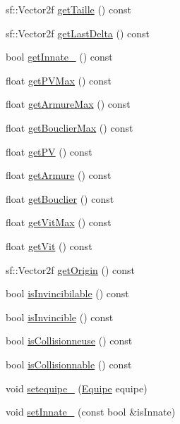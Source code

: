 \begin{DoxyCompactItemize}
\item 
sf\+::\+Vector2f \mbox{\hyperlink{class_entite_ac9ce99e4eb26bb9c4b9f2c8aaf3899c8}{get\+Taille}} () const
\item 
sf\+::\+Vector2f \mbox{\hyperlink{class_entite_aa4c414fcfe783fc8483ce9466d8764c0}{get\+Last\+Delta}} () const
\item 
bool \mbox{\hyperlink{class_entite_af607aa77e0ce2f6afa3cf8fdd073b9cf}{get\+Innate\+\_\+}} () const
\item 
float \mbox{\hyperlink{class_entite_a474c3aad164255a66c0c9d39b6e4ed1f}{get\+P\+V\+Max}} () const
\item 
float \mbox{\hyperlink{class_entite_aa7c171ab62d923d8b6f2912851ac7b1d}{get\+Armure\+Max}} () const
\item 
float \mbox{\hyperlink{class_entite_adecf490f77d783aa9492eb833b307939}{get\+Bouclier\+Max}} () const
\item 
float \mbox{\hyperlink{class_entite_aa803a384c574a66d2b104fafd43f189a}{get\+PV}} () const
\item 
float \mbox{\hyperlink{class_entite_a06ac37b64ff428cd03ba0c935c101227}{get\+Armure}} () const
\item 
float \mbox{\hyperlink{class_entite_ae680682baaeab669956e9060fca74923}{get\+Bouclier}} () const
\item 
float \mbox{\hyperlink{class_entite_a4b57be1f229ec78b5c1a8ea70bdd1d3d}{get\+Vit\+Max}} () const
\item 
float \mbox{\hyperlink{class_entite_a36d7c2ce68d2965d08fe28c77a3b4a70}{get\+Vit}} () const
\item 
sf\+::\+Vector2f \mbox{\hyperlink{class_entite_a23480947ca71fd3c6004f8b704f675b0}{get\+Origin}} () const
\item 
bool \mbox{\hyperlink{class_entite_a7fd69c84f3f9a670356a333640cc5b77}{is\+Invincibilable}} () const
\item 
bool \mbox{\hyperlink{class_entite_a3905c5bfe2890fd5da1f7ea704c277ac}{is\+Invincible}} () const
\item 
bool \mbox{\hyperlink{class_entite_af18791ba27e747f426db1125bf77aeff}{is\+Collisionneuse}} () const
\item 
bool \mbox{\hyperlink{class_entite_ac28aac949f2451d883aafaabb65a7b90}{is\+Collisionnable}} () const
\item 
void \mbox{\hyperlink{class_entite_ac5e59154ac3eb3f131d9ed7f2c84d7a8}{setequipe\+\_\+}} (\mbox{\hyperlink{constantes_8h_a08fa5554288d5031a8f3bb83cc04ee83}{Equipe}} equipe)
\item 
void \mbox{\hyperlink{class_entite_a43a21ff043627fb6737aeb2a4f3e4986}{set\+Innate\+\_\+}} (const bool \&is\+Innate)

\end{DoxyCompactItemize}
